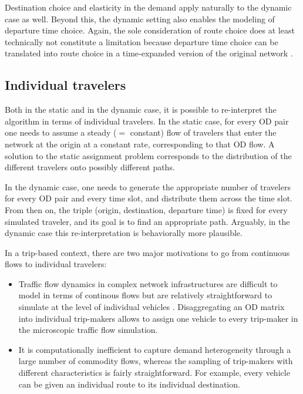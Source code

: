 Destination choice and elasticity in the demand apply naturally to 
the dynamic case as well. Beyond this, the dynamic setting also enables 
the modeling of departure time choice. Again, the sole consideration 
of route choice does at least technically not constitute a limitation 
because departure time choice can be translated into route choice in a 
time-expanded version of the original network \citep{vanderzijpp-2001}.


\subsection{Individual travelers}
\label{sec:indiv-trav}

Both in the static and in the dynamic case, it is possible to
re-interpret the algorithm in terms of individual travelers.  
%
In the static case, for every OD pair one needs to
assume a steady ($=$ constant) flow of travelers that enter the
network at the origin at a constant rate, corresponding to that OD flow.
A solution to the static assignment problem corresponds to the
distribution of the different travelers onto possibly different paths.

In the dynamic case, one needs to generate the appropriate number of
travelers for every OD pair and every time slot, and distribute them
across the time slot.  From then on, the triple (origin, destination,
departure time) is fixed for every simulated traveler, and its goal is
to find an appropriate path.  
%
%
Arguably, in the dynamic case this re-interpretation is behaviorally
more plausible.

In a trip-based context, there are two major motivations to go from 
continuous flows to individual travelers:
\begin{itemize}

\item Traffic flow dynamics in complex network infrastructures are 
difficult to model in terms of continous flows 
\citep[e.g.,][]{floetteroed-2011a} but are relatively straightforward 
to simulate at the level of individual vehicles
\citep[][]{aimsun-www,mitsim-www,paramics-www,vissim-www}. 
Disaggregating an OD matrix into individual trip-makers allows to 
assign one vehicle to every trip-maker in the microscopic traffic flow 
simulation.

\item It is computationally inefficient to capture demand heterogeneity 
through a large number of commodity flows, whereas the sampling of 
trip-makers with different characteristics is fairly straightforward. 
For example, every vehicle can be given an individual route to its individual 
destination.

\end{itemize}

